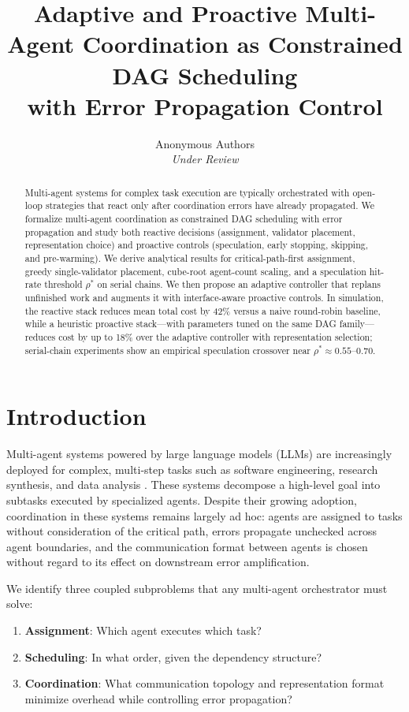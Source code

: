 \documentclass[10pt, twocolumn]{article}
\title{Adaptive and Proactive Multi-Agent Coordination as Constrained DAG Scheduling\\with Error Propagation Control}
\author{%
  Anonymous Authors\\
  \textit{Under Review}
}
\date{}
\begin{document}
\maketitle

\begin{abstract}
Multi-agent systems for complex task execution are typically orchestrated with open-loop strategies that react only after coordination errors have already propagated. We formalize multi-agent coordination as constrained DAG scheduling with error propagation and study both reactive decisions (assignment, validator placement, representation choice) and proactive controls (speculation, early stopping, skipping, and pre-warming). We derive analytical results for critical-path-first assignment, greedy single-validator placement, cube-root agent-count scaling, and a speculation hit-rate threshold $\rho^*$ on serial chains. We then propose an adaptive controller that replans unfinished work and augments it with interface-aware proactive controls. In simulation, the reactive stack reduces mean total cost by 42\% versus a naive round-robin baseline, while a heuristic proactive stack---with parameters tuned on the same DAG family---reduces cost by up to 18\% over the adaptive controller with representation selection; serial-chain experiments show an empirical speculation crossover near $\rho^* \approx 0.55$--$0.70$.
\end{abstract}

\section{Introduction}

Multi-agent systems powered by large language models (LLMs) are increasingly deployed for complex, multi-step tasks such as software engineering, research synthesis, and data analysis \citep{yao2023react, hong2023metagpt, wu2023autogen}. These systems decompose a high-level goal into subtasks executed by specialized agents. Despite their growing adoption, coordination in these systems remains largely ad hoc: agents are assigned to tasks without consideration of the critical path, errors propagate unchecked across agent boundaries, and the communication format between agents is chosen without regard to its effect on downstream error amplification.

We identify three coupled subproblems that any multi-agent orchestrator must solve:
\begin{enumerate}
    \item \textbf{Assignment}: Which agent executes which task?
    \item \textbf{Scheduling}: In what order, given the dependency structure?
    \item \textbf{Coordination}: What communication topology and representation format minimize overhead while controlling error propagation?
\end{enumerate}
\end{document}
